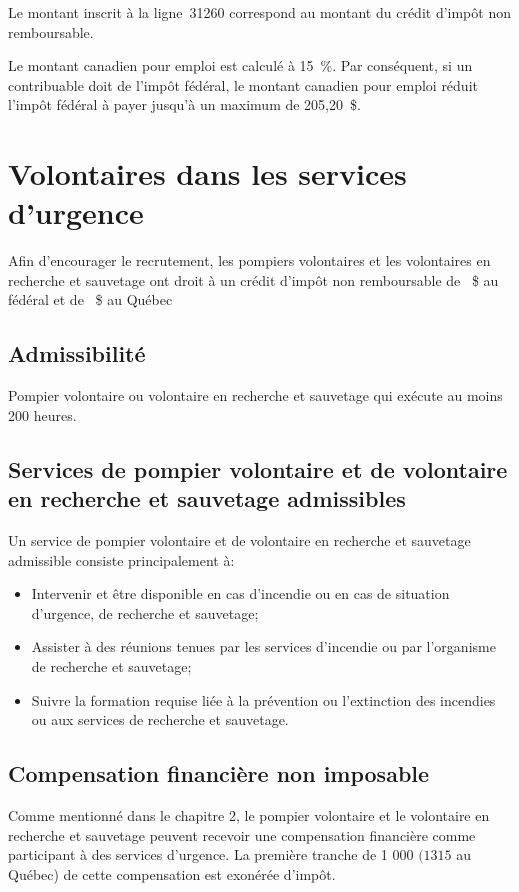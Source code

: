 \begin{note}
	Le montant inscrit à la ligne~31260 correspond au montant du crédit d'impôt non remboursable.
	
	Le montant canadien pour emploi est calculé à 15~\%. Par conséquent, si un contribuable doit de l'impôt fédéral, le montant canadien pour emploi réduit l'impôt fédéral à payer jusqu'à un maximum de 205,20~\$.
\end{note}



\section{Volontaires dans les services d'urgence}
Afin d'encourager le recrutement, les pompiers volontaires et les volontaires en recherche et sauvetage ont droit à un crédit d'impôt non remboursable de ~\$ au fédéral et de ~\$ au Québec


\subsection{Admissibilité}
Pompier volontaire ou volontaire en recherche et sauvetage qui exécute au moins 200 heures.


\subsection{Services de pompier volontaire et de volontaire en recherche et sauvetage admissibles}
Un service de pompier volontaire et de volontaire en recherche et sauvetage admissible consiste principalement à:
\begin{itemize}
	\item Intervenir et être disponible en cas d'incendie ou en cas de situation d'urgence, de recherche et sauvetage;
	\item Assister à des réunions tenues par les services d'incendie ou par l'organisme de recherche et sauvetage;
	\item Suivre la formation requise liée à la prévention ou l'extinction des incendies ou aux services de recherche et sauvetage.
\end{itemize}


\subsection{Compensation financière non imposable}
Comme mentionné dans le chapitre 2, le pompier volontaire et le volontaire en recherche et sauvetage peuvent recevoir une compensation financière comme participant à des services d'urgence. La première tranche de 1 000 $ (1 315 $ au Québec) de cette compensation est exonérée d'impôt.

